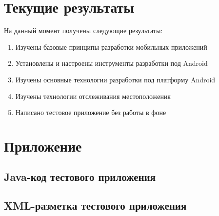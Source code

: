 \documentclass[a4paper,12pt]{article}
\begin{document}

\pagebreak


\section{Текущие результаты}

На данный момент получены следующие результаты:

\begin{enumerate}
\item Изучены базовые принципы разработки мобильных приложений
\item Установлены и настроены инструменты разработки под Android
\item Изучены основные технологии разработки под платформу Android
\item Изучены технологии отслеживания местоположения
\item Написано тестовое приложение без работы в фоне
\end{enumerate}




\pagebreak
\section{Приложение}
\subsection{Java-код тестового приложения}

\subsection{XML-разметка тестового приложения}

\pagebreak
\end{document}
